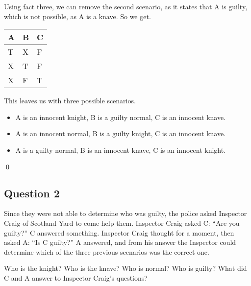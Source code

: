 \documentclass{article}
\begin{document}
\begin{addmargin}[0.75cm]{0cm}
	Using fact three, we can remove the second scenario, as it states that A is guilty, which is not possible, as A is a knave. So we get.
	
	\begin{center}
		\begin{tabular}{ L L L }
			A & B & C \\
			\hline
			T & X & F \\  
			X & T & F \\ 
			X & F & T
		\end{tabular}
	\end{center}
	
	This leaves us with three possible scenarios.
	
	\begin{itemize}[noitemsep, nolistsep]
		\item A is an innocent knight, B is a guilty normal, C is an innocent knave.
		\item A is an innocent normal, B is a guilty knight, C is an innocent knave.
		\item A is a guilty normal, B is an innocent knave, C is an innocent knight.
	\end{itemize}
	
	\qed
\end{addmargin}

\pagebreak

\subsection{Question 2} 
Since they were not able to determine who was guilty, the police asked Inspector
Craig of Scotland Yard to come help them. Inspector Craig asked C: “Are you guilty?” C
answered something. Inspector Craig thought for a moment, then asked A: “Is C guilty?”
A answered, and from his answer the Inspector could determine which of the three previous
scenarios was the correct one.


Who is the knight? Who is the knave? Who is normal? Who is guilty? What did C and A
answer to Inspector Craig’s questions?
\end{document}
